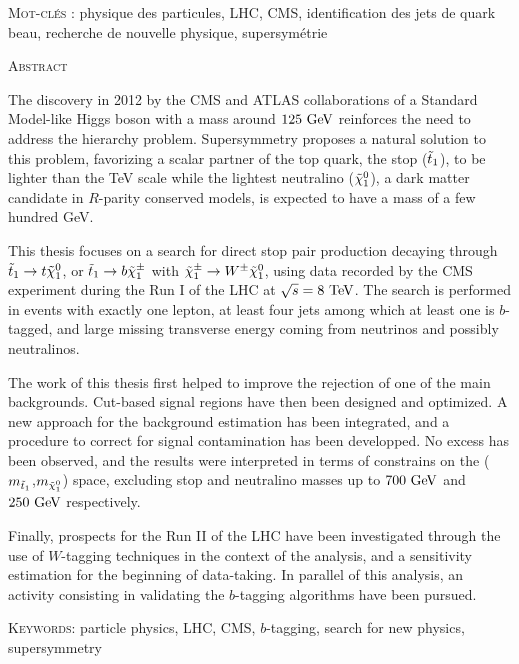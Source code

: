 {\begin{framed}
\textsc{Mot-clés} : physique des particules, LHC, CMS, identification des jets de quark beau, recherche de nouvelle physique, supersymétrie
\end{framed}

\begin{framed}
    \vspace*{-0.7cm}
\begin{center}\textsc{Abstract}\end{center}
    \vspace*{-0.3cm}
    The discovery in 2012 by the CMS and ATLAS collaborations of a Standard Model-like Higgs boson
with a mass around $125~\text{GeV}$ reinforces the need to address the hierarchy problem. Supersymmetry
proposes a natural solution to this problem, favorizing a scalar partner of the top quark,
the stop ($\tilde{t}_1$), to be lighter than the TeV scale while the lightest neutralino
($\tilde{\chi}_1^0$), a dark matter candidate in $R$-parity conserved models, is expected to have
a mass of a few hundred GeV.

    This thesis focuses on a search for direct stop pair production decaying through
$\tilde{t}_1 \rightarrow t \tilde{\chi}_1^0$, or $\tilde{t}_1 \rightarrow b \tilde{\chi}_1^\pm$ with
$\tilde{\chi}_1^\pm \rightarrow W^\pm \tilde{\chi}_1^0$, using data recorded by the CMS experiment during
the Run I of the LHC at $\sqrt{s} = 8~\text{TeV}$. The search is performed in events with exactly
one lepton, at least four jets among which at least one is $b$-tagged, and large missing
transverse energy coming from neutrinos and possibly neutralinos.

    The work of this thesis first helped to improve the rejection of one of the main backgrounds.
Cut-based signal regions have then been designed and optimized. A new approach for the background
estimation has been integrated, and a procedure to correct for signal contamination has
been developped. No excess has been observed, and the results were interpreted in terms of
constrains on the ($m_{\tilde{t}_1}$,$m_{\tilde{\chi}_1^0}$) space, excluding stop and neutralino
masses up to $700~\text{GeV}$ and $250~\text{GeV}$ respectively.

    Finally, prospects for the Run II of the LHC have been investigated through the use of
$W$-tagging techniques in the context of the analysis, and a sensitivity estimation for the
beginning of data-taking. In parallel of this analysis, an activity consisting in validating
the $b$-tagging algorithms have been pursued.

\textsc{Keywords}: particle physics, LHC, CMS, $b$-tagging, search for new physics, supersymmetry\end{framed}}
\restoregeometry
